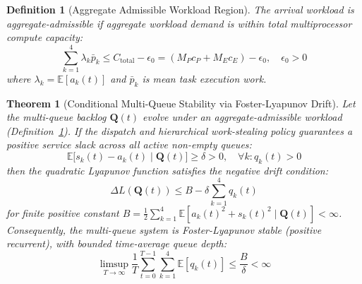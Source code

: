 \documentclass[conference]{IEEEtran}
\newtheorem{theorem}{Theorem}
\newtheorem{definition}{Definition}
\begin{document}
\begin{definition}[Aggregate Admissible Workload Region]
\label{def:class_admissible}
The arrival workload is aggregate-admissible if aggregate workload demand is within total multiprocessor compute capacity:
\begin{equation}
\label{eq:admissible_cond}
\sum_{k=1}^4 \lambda_k \bar{p}_k \le C_{\mathrm{total}} - \epsilon_0 = (M_P c_P + M_E c_E) - \epsilon_0, \quad \epsilon_0 > 0
\end{equation}
where $\lambda_k = \mathbb{E}[a_k(t)]$ and $\bar{p}_k$ is mean task execution work.
\end{definition}

\begin{theorem}[Conditional Multi-Queue Stability via Foster-Lyapunov Drift]
\label{thm:stability}
Let the multi-queue backlog $\mathbf{Q}(t)$ evolve under an aggregate-admissible workload (Definition~\ref{def:class_admissible}). If the dispatch and hierarchical work-stealing policy guarantees a positive service slack across all active non-empty queues:
\begin{equation}
\label{eq:slack_cond}
\mathbb{E}\big[ s_k(t) - a_k(t) \;\big|\; \mathbf{Q}(t) \big] \ge \delta > 0, \quad \forall k: q_k(t) > 0
\end{equation}
then the quadratic Lyapunov function satisfies the negative drift condition:
\begin{equation}
\Delta L(\mathbf{Q}(t)) \le B - \delta \sum_{k=1}^4 q_k(t)
\end{equation}
for finite positive constant $B = \frac{1}{2} \sum_{k=1}^4 \mathbb{E}[a_k(t)^2 + s_k(t)^2 \mid \mathbf{Q}(t)] < \infty$. Consequently, the multi-queue system is Foster-Lyapunov stable (positive recurrent), with bounded time-average queue depth:
\begin{equation}
\limsup_{T \to \infty} \frac{1}{T} \sum_{t=0}^{T-1} \sum_{k=1}^4 \mathbb{E}[q_k(t)] \le \frac{B}{\delta} < \infty
\end{equation}
\end{theorem}
\end{document}
